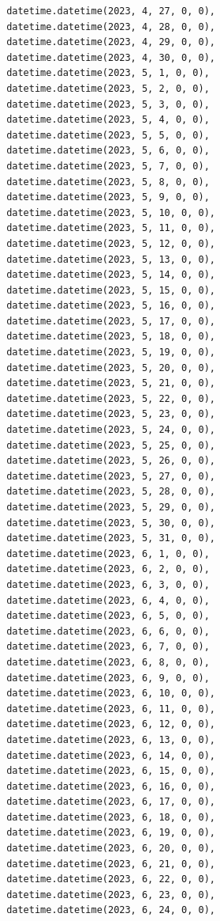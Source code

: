 \documentclass[
  letterpaper,
  DIV=11,
  numbers=noendperiod,
  oneside]{scrreprt}
\begin{document}
\begin{verbatim}
       datetime.datetime(2023, 4, 27, 0, 0),
       datetime.datetime(2023, 4, 28, 0, 0),
       datetime.datetime(2023, 4, 29, 0, 0),
       datetime.datetime(2023, 4, 30, 0, 0),
       datetime.datetime(2023, 5, 1, 0, 0),
       datetime.datetime(2023, 5, 2, 0, 0),
       datetime.datetime(2023, 5, 3, 0, 0),
       datetime.datetime(2023, 5, 4, 0, 0),
       datetime.datetime(2023, 5, 5, 0, 0),
       datetime.datetime(2023, 5, 6, 0, 0),
       datetime.datetime(2023, 5, 7, 0, 0),
       datetime.datetime(2023, 5, 8, 0, 0),
       datetime.datetime(2023, 5, 9, 0, 0),
       datetime.datetime(2023, 5, 10, 0, 0),
       datetime.datetime(2023, 5, 11, 0, 0),
       datetime.datetime(2023, 5, 12, 0, 0),
       datetime.datetime(2023, 5, 13, 0, 0),
       datetime.datetime(2023, 5, 14, 0, 0),
       datetime.datetime(2023, 5, 15, 0, 0),
       datetime.datetime(2023, 5, 16, 0, 0),
       datetime.datetime(2023, 5, 17, 0, 0),
       datetime.datetime(2023, 5, 18, 0, 0),
       datetime.datetime(2023, 5, 19, 0, 0),
       datetime.datetime(2023, 5, 20, 0, 0),
       datetime.datetime(2023, 5, 21, 0, 0),
       datetime.datetime(2023, 5, 22, 0, 0),
       datetime.datetime(2023, 5, 23, 0, 0),
       datetime.datetime(2023, 5, 24, 0, 0),
       datetime.datetime(2023, 5, 25, 0, 0),
       datetime.datetime(2023, 5, 26, 0, 0),
       datetime.datetime(2023, 5, 27, 0, 0),
       datetime.datetime(2023, 5, 28, 0, 0),
       datetime.datetime(2023, 5, 29, 0, 0),
       datetime.datetime(2023, 5, 30, 0, 0),
       datetime.datetime(2023, 5, 31, 0, 0),
       datetime.datetime(2023, 6, 1, 0, 0),
       datetime.datetime(2023, 6, 2, 0, 0),
       datetime.datetime(2023, 6, 3, 0, 0),
       datetime.datetime(2023, 6, 4, 0, 0),
       datetime.datetime(2023, 6, 5, 0, 0),
       datetime.datetime(2023, 6, 6, 0, 0),
       datetime.datetime(2023, 6, 7, 0, 0),
       datetime.datetime(2023, 6, 8, 0, 0),
       datetime.datetime(2023, 6, 9, 0, 0),
       datetime.datetime(2023, 6, 10, 0, 0),
       datetime.datetime(2023, 6, 11, 0, 0),
       datetime.datetime(2023, 6, 12, 0, 0),
       datetime.datetime(2023, 6, 13, 0, 0),
       datetime.datetime(2023, 6, 14, 0, 0),
       datetime.datetime(2023, 6, 15, 0, 0),
       datetime.datetime(2023, 6, 16, 0, 0),
       datetime.datetime(2023, 6, 17, 0, 0),
       datetime.datetime(2023, 6, 18, 0, 0),
       datetime.datetime(2023, 6, 19, 0, 0),
       datetime.datetime(2023, 6, 20, 0, 0),
       datetime.datetime(2023, 6, 21, 0, 0),
       datetime.datetime(2023, 6, 22, 0, 0),
       datetime.datetime(2023, 6, 23, 0, 0),
       datetime.datetime(2023, 6, 24, 0, 0),

\end{verbatim}
\end{document}
